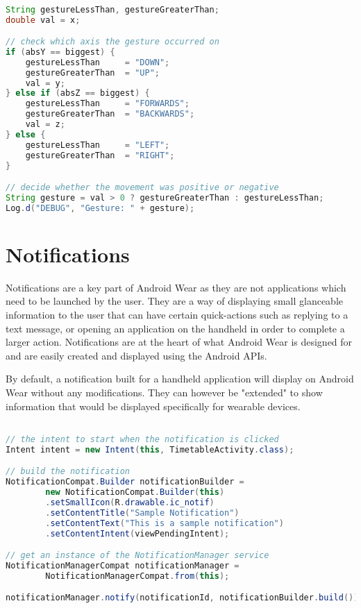 \begin{lstlisting}[language=Java]

String gestureLessThan, gestureGreaterThan;
double val = x;

// check which axis the gesture occurred on
if (absY == biggest) {
    gestureLessThan     = "DOWN";
    gestureGreaterThan  = "UP";
    val = y;
} else if (absZ == biggest) {
    gestureLessThan     = "FORWARDS";
    gestureGreaterThan  = "BACKWARDS";
    val = z;
} else {
    gestureLessThan     = "LEFT";
    gestureGreaterThan  = "RIGHT";
}

// decide whether the movement was positive or negative
String gesture = val > 0 ? gestureGreaterThan : gestureLessThan;
Log.d("DEBUG", "Gesture: " + gesture);

\end{lstlisting}

\section{Notifications}

Notifications are a key part of Android Wear as they are not applications which
need to be launched by the user. They are a way of displaying small glanceable
information to the user that can have certain quick-actions such as replying
to a text message, or opening an application on the handheld in order to
complete a larger action. Notifications are at the heart of what Android Wear
is designed for and are easily created and displayed using the Android APIs.

By default, a notification built for a handheld application will display on
Android Wear without any modifications. They can however be "extended" to show
information that would be displayed specifically for wearable devices.

\begin{lstlisting}[language=Java]

// the intent to start when the notification is clicked
Intent intent = new Intent(this, TimetableActivity.class);

// build the notification
NotificationCompat.Builder notificationBuilder =
        new NotificationCompat.Builder(this)
        .setSmallIcon(R.drawable.ic_notif)
        .setContentTitle("Sample Notification")
        .setContentText("This is a sample notification")
        .setContentIntent(viewPendingIntent);

// get an instance of the NotificationManager service
NotificationManagerCompat notificationManager =
        NotificationManagerCompat.from(this);

notificationManager.notify(notificationId, notificationBuilder.build());

\end{lstlisting}


